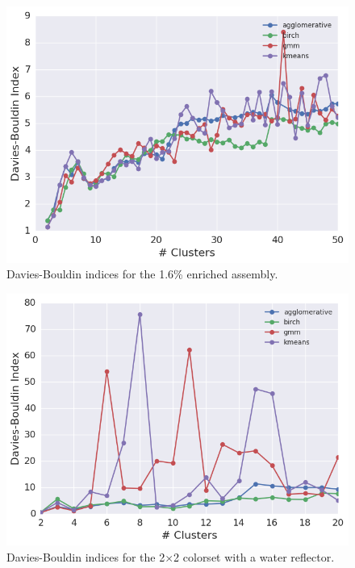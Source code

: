\begin{figure}[h!]
\centering
\includegraphics[width=0.87\linewidth]{figures/results/model-select/assm-16/db-combined-U238-capture-1}
\vspace{2mm}
\caption[Davies-Bouldin indices for the 1.6\% enriched assembly]{Davies-Bouldin indices for the 1.6\% enriched assembly.}
\label{fig:chap11-assm-16-db-index}
\end{figure}

\begin{figure}[h!]
\centering
\includegraphics[width=0.87\linewidth]{figures/results/model-select/reflector/db-combined-U238-nu-fission-1}
\vspace{2mm}
\caption[Davies-Bouldin indices for the 2$\times$2 colorset with reflector]{Davies-Bouldin indices for the 2$\times$2 colorset with a water reflector.}
\label{fig:chap11-refl-db-index}
\end{figure}

